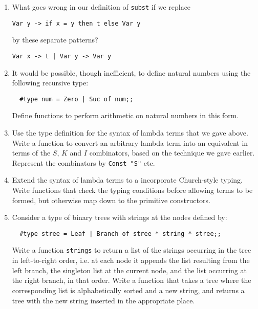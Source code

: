 \begin{enumerate}

\item What goes wrong in our definition of {\tt subst} if we replace

{\verb+Var y -> if x = y then t else Var y+}

\noindent by these separate patterns?

{\verb+Var x -> t | Var y -> Var y+}

\item It would be possible, though inefficient, to define natural numbers using
the following recursive type:

\begin{boxed}\begin{verbatim}
  #type num = Zero | Suc of num;;
\end{verbatim}\end{boxed}

Define functions to perform arithmetic on natural numbers in this form.

\item Use the type definition for the syntax of lambda terms that we gave
above. Write a function to convert an arbitrary lambda term into an equivalent
in terms of the $S$, $K$ and $I$ combinators, based on the technique we gave
earlier. Represent the combinators by {\tt Const "S"} etc.

\item Extend the syntax of lambda terms to a incorporate Church-style typing.
Write functions that check the typing conditions before allowing terms to be
formed, but otherwise map down to the primitive constructors.

\item Consider a type of binary trees with strings at the nodes defined by:

\begin{boxed}\begin{verbatim}
  #type stree = Leaf | Branch of stree * string * stree;;
\end{verbatim}\end{boxed}

Write a function {\tt strings} to return a list of the strings occurring in the
tree in left-to-right order, i.e. at each node it appends the list resulting
from the left branch, the singleton list at the current node, and the list
occurring at the right branch, in that order. Write a function that takes a
tree where the corresponding list is alphabetically sorted and a new string,
and returns a tree with the new string inserted in the appropriate place.


\end{enumerate}
